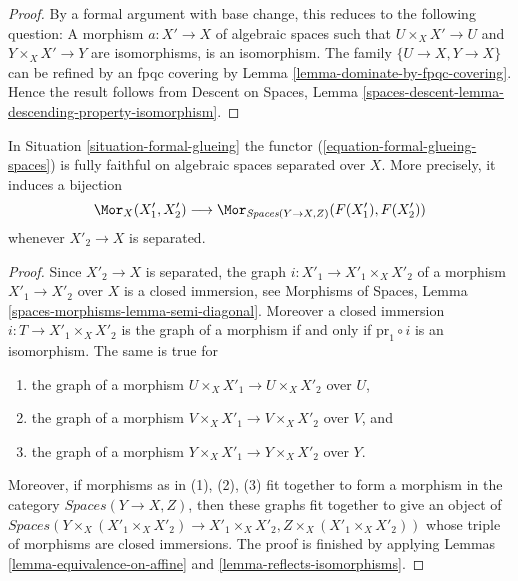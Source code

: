 \begin{proof}
By a formal argument with base change, this reduces to the following
question: A morphism $a : X' \to X$ of algebraic spaces such that
$U \times_X X' \to U$ and $Y \times_X X' \to Y$ are isomorphisms, is
an isomorphism. The family $\{U \to X, Y \to X\}$ can be refined by
an fpqc covering by Lemma \ref{lemma-dominate-by-fpqc-covering}.
Hence the result follows from
Descent on Spaces, Lemma
\ref{spaces-descent-lemma-descending-property-isomorphism}.
\end{proof}

\begin{lemma}
\label{lemma-fully-faithful-on-separated}
In Situation \ref{situation-formal-glueing} the functor
(\ref{equation-formal-glueing-spaces}) is fully faithful
on algebraic spaces separated over $X$. More precisely, it induces
a bijection
$$
\Mor_X(X'_1, X'_2)
\longrightarrow
\Mor_{\textit{Spaces}(Y \to X, Z)}(F(X'_1), F(X'_2))
$$
whenever $X'_2 \to X$ is separated.
\end{lemma}

\begin{proof}
Since $X'_2 \to X$ is separated, the graph $i : X'_1 \to X'_1 \times_X X'_2$
of a morphism $X'_1 \to X'_2$ over $X$ is a closed immersion, see
Morphisms of Spaces, Lemma \ref{spaces-morphisms-lemma-semi-diagonal}.
Moreover a closed immersion $i : T \to X'_1 \times_X X'_2$ is the graph of a
morphism if and only if $\text{pr}_1 \circ i$ is an isomorphism.
The same is true for
\begin{enumerate}
\item the graph of a morphism $U \times_X X'_1 \to U \times_X X'_2$ over $U$,
\item the graph of a morphism $V \times_X X'_1 \to V \times_X X'_2$ over $V$,
and
\item the graph of a morphism $Y \times_X X'_1 \to Y \times_X X'_2$ over $Y$.
\end{enumerate}
Moreover, if morphisms as in (1), (2), (3) fit together to form a
morphism in the category $\textit{Spaces}(Y \to X, Z)$, then these
graphs fit together to give an object of
$\textit{Spaces}(Y \times_X (X'_1 \times_X X'_2) \to X'_1 \times_X X'_2,
Z \times_X (X'_1 \times_X X'_2))$
whose triple of morphisms are closed immersions. The proof is finished
by applying Lemmas \ref{lemma-equivalence-on-affine} and
\ref{lemma-reflects-isomorphisms}.
\end{proof}






